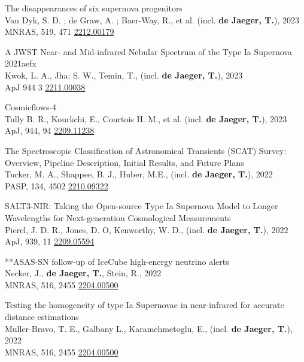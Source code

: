 \documentclass[12pt]{article}
\begin{document}
\begin{bibenum}
    \item 
 The disappearances of six supernova progenitors \\
Van Dyk, S. D. ; de Graw, A. ; Baer-Way, R., et al. (incl. \textbf{de Jaeger, T.}), 2023\\
MNRAS, 519, 471 \href{https://arxiv.org/abs/2212.00179}{2212.00179} 
    \item 
A JWST Near- and Mid-infrared Nebular Spectrum of the Type Ia Supernova 2021aefx  \\
Kwok, L. A., Jha; S. W., Temin, T., (incl. \textbf{de Jaeger, T.}), 2023 \\
ApJ 944 3 \href{https://arxiv.org/abs/2211.00038}{2211.00038}
    \item 
 Cosmicflows-4\\ 
Tully B. R., Kourkchi, E., Courtois H. M., et al. (incl. \textbf{de Jaeger, T.}), 2023\\
ApJ, 944, 94 \href{https://arxiv.org/abs/2209.11238}{2209.11238} 

    \item     
The Spectroscopic Classification of Astronomical Transients (SCAT) Survey: Overview, Pipeline Description, Initial Results, and Future Plans  \\
Tucker, M. A., Shappee, B. J., Huber, M.E., (incl. \textbf{de Jaeger, T.}), 2022 \\
PASP, 134, 4502 \href{https://arxiv.org/abs/2210.09322}{2210.09322}
    \item 
SALT3-NIR: Taking the Open-source Type Ia Supernova Model to Longer Wavelengths for Next-generation Cosmological Measurements  \\
Pierel, J. D. R., Jones, D. O, Kenworthy, W. D., (incl. \textbf{de Jaeger, T.}), 2022 \\
ApJ, 939, 11 \href{https://arxiv.org/abs/2209.05594}{2209.05594}

    \item 
**ASAS-SN follow-up of IceCube high-energy neutrino alerts\\
Necker, J., \textbf{de Jaeger, T.}, Stein, R., 2022 \\
MNRAS, 516, 2455 \href{https://arxiv.org/abs/2204.00500}{2204.00500}

    \item 
Testing the homogeneity of type Ia Supernovae in near-infrared for accurate distance estimations \\
Muller-Bravo, T. E., Galbany L., Karamehmetoglu, E., (incl. \textbf{de Jaeger, T.}), 2022 \\
MNRAS, 516, 2455 \href{https://arxiv.org/abs/2204.00500}{2204.00500}


\end{bibenum}
\end{document}

